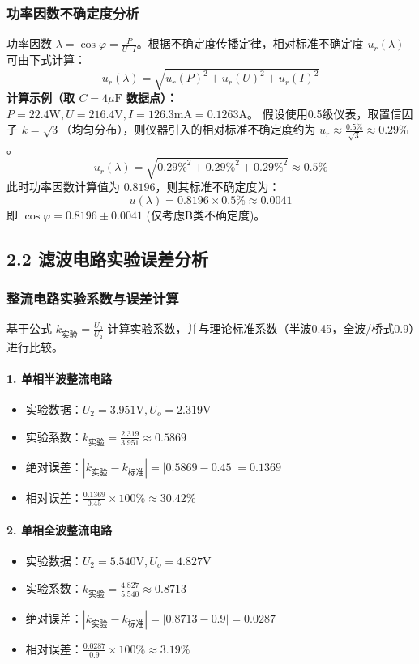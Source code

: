 \documentclass[]{../../templates/Report}%
\begin{document}
\begin{fullreportonly}
    \subsubsection{功率因数不确定度分析}
    功率因数 $\lambda = \cos\varphi = \frac{P}{U \cdot I}$。根据不确定度传播定律，相对标准不确定度 $u_r(\lambda)$ 可由下式计算：
    $$ u_r(\lambda) = \sqrt{u_r(P)^2 + u_r(U)^2 + u_r(I)^2} $$
    \textbf{计算示例（取 $C=4\mu\text{F}$ 数据点）：}
    $P=22.4\text{W}, U=216.4\text{V}, I=126.3\text{mA}=0.1263\text{A}$。
    假设使用0.5级仪表，取置信因子 $k=\sqrt{3}$（均匀分布），则仪器引入的相对标准不确定度约为 $u_r \approx \frac{0.5\%}{\sqrt{3}} \approx 0.29\%$。
    $$ u_r(\lambda) = \sqrt{0.29\%^2 + 0.29\%^2 + 0.29\%^2} \approx 0.5\% $$
    此时功率因数计算值为 $0.8196$，则其标准不确定度为：
    $$ u(\lambda) = 0.8196 \times 0.5\% \approx 0.0041 $$
    即 $\cos\varphi = 0.8196 \pm 0.0041$ (仅考虑B类不确定度)。

    \subsection{2.2 滤波电路实验误差分析}

    \subsubsection{整流电路实验系数与误差计算}
    基于公式 $k_{\text{实验}} = \frac{U_o}{U_2}$ 计算实验系数，并与理论标准系数（半波0.45，全波/桥式0.9）进行比较。

    \paragraph{1. 单相半波整流电路}
    \begin{itemize}
        \item 实验数据：$U_2 = 3.951\text{V}, U_o = 2.319\text{V}$
        \item 实验系数：$k_{\text{实验}} = \frac{2.319}{3.951} \approx 0.5869$
        \item 绝对误差：$|k_{\text{实验}} - k_{\text{标准}}| = |0.5869 - 0.45| = 0.1369$
        \item 相对误差：$\frac{0.1369}{0.45} \times 100\% \approx 30.42\%$
    \end{itemize}

    \paragraph{2. 单相全波整流电路}
    \begin{itemize}
        \item 实验数据：$U_2 = 5.540\text{V}, U_o = 4.827\text{V}$
        \item 实验系数：$k_{\text{实验}} = \frac{4.827}{5.540} \approx 0.8713$
        \item 绝对误差：$|k_{\text{实验}} - k_{\text{标准}}| = |0.8713 - 0.9| = 0.0287$
        \item 相对误差：$\frac{0.0287}{0.9} \times 100\% \approx 3.19\%$
    \end{itemize}


\end{fullreportonly}
\end{document}
